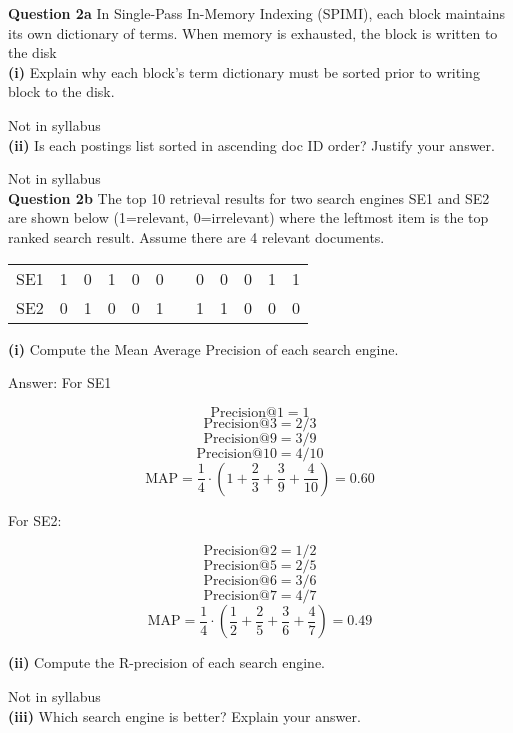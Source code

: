 \documentclass[11pt,a4paper]{report}
\begin{document}
\begin{multicols*}{2}
\noindent \textbf{Question 2a} In Single-Pass In-Memory Indexing (SPIMI), each block maintains its own dictionary of terms. When memory is exhausted, the block is written to the disk\\

\noindent \textbf{(i)} Explain why each block's term dictionary must be sorted prior to writing block to the disk.

\noindent Not in syllabus\\

\noindent \textbf{(ii)} Is each postings list sorted in ascending doc ID order? Justify your answer. 

\noindent Not in syllabus\\

\noindent \textbf{Question 2b} The top 10 retrieval results for two search engines SE1 and SE2 are shown below (1=relevant, 0=irrelevant) where the leftmost item is the top ranked search result. Assume there are 4 relevant documents.

\begin{center}
\begin{tabular}{ l l l l l l l l l l l l}
    SE1 & 1 & 0 & 1 & 0 & 0 &  & 0 & 0 & 0 & 1 & 1 \\
    SE2 & 0 & 1 & 0 & 0 & 1 &  & 1 & 1 & 0 & 0 & 0 \\
\end{tabular}
\end{center}

\noindent \textbf{(i)} Compute the Mean Average Precision of each search engine.

\noindent Answer: For SE1

$$\text{Precision@1}=1$$
$$\text{Precision@3}=2/3$$
$$\text{Precision@9}=3/9$$
$$\text{Precision@10}=4/10$$
$$\text{MAP} = \frac{1}{4} \cdot (1 + \frac{2}{3} + \frac{3}{9} + \frac{4}{10})= 0.60$$

\noindent For SE2:

$$\text{Precision@2}=1/2$$
$$\text{Precision@5}=2/5$$
$$\text{Precision@6}=3/6$$
$$\text{Precision@7}=4/7$$
$$\text{MAP} = \frac{1}{4} \cdot (\frac{1}{2} + \frac{2}{5} + \frac{3}{6} + \frac{4}{7}) = 0.49$$

\noindent \textbf{(ii)} Compute the R-precision of each search engine.

\noindent Not in syllabus\\

\noindent \textbf{(iii)} Which search engine is better? Explain your answer.


\end{multicols*}
\end{document}
